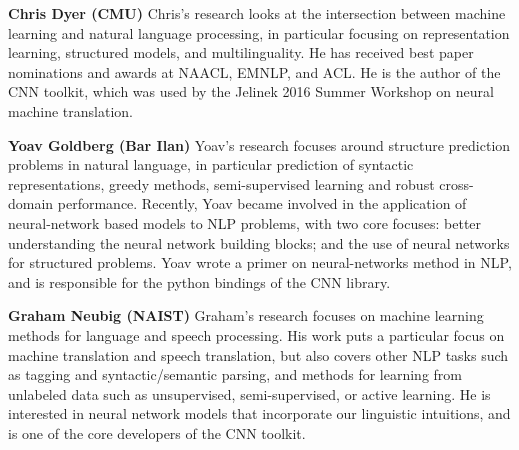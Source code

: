 \begin{bio}
\textbf{Chris Dyer (CMU)}
 Chris’s research looks at the intersection between machine learning and natural language processing, in particular focusing on representation learning, structured models, and multilinguality. He has received best paper nominations and awards at NAACL, EMNLP, and ACL. He is the author of the CNN toolkit, which was used by the Jelinek 2016 Summer Workshop on neural machine translation.

\textbf{Yoav Goldberg (Bar Ilan)}
 Yoav’s research focuses around structure prediction problems in natural language, in particular prediction of syntactic representations, greedy methods, semi-supervised learning and robust cross-domain performance. Recently, Yoav became involved in the application of neural-network based models to NLP problems, with two core focuses: better understanding the neural network building blocks; and the use of neural networks for structured problems. Yoav wrote a primer on neural-networks method in NLP, and is responsible for the python bindings of the CNN library.

\textbf{Graham Neubig (NAIST)}
 Graham’s research focuses on machine learning methods for language and speech processing. His work puts a particular focus on machine translation and speech translation, but also covers other NLP tasks such as tagging and syntactic/semantic parsing, and methods for learning from unlabeled data such as unsupervised, semi-supervised, or active learning. He is interested in neural network models that incorporate our linguistic intuitions, and is one of the core developers of the CNN toolkit. 
   
\end{bio}



